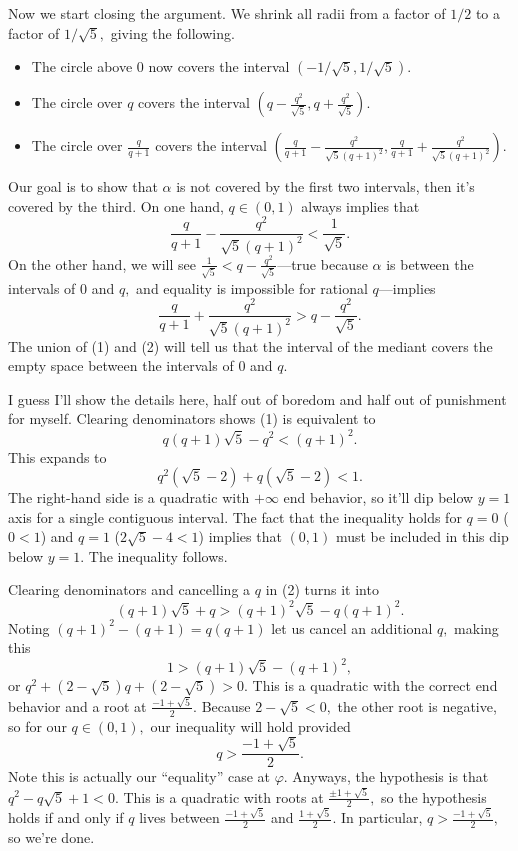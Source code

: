 Now we start closing the argument. We shrink all radii from a factor of $1/2$ to a factor of $1/\sqrt5,$ giving the following.
\begin{itemize}
    \item The circle above $0$ now covers the interval $(-1/\sqrt5,1/\sqrt5).$
    \item The circle over $q$ covers the interval $\left(q-\frac{q^2}{\sqrt5},q+\frac{q^2}{\sqrt5}\right).$
    \item The circle over $\frac q{q+1}$ covers the interval $\left(\frac q{q+1}-\frac{q^2}{\sqrt5(q+1)^2},\frac q{q+1}+\frac{q^2}{\sqrt5(q+1)^2}\right).$
\end{itemize}
Our goal is to show that $\alpha$ is not covered by the first two intervals, then it's covered by the third. On one hand, $q\in(0,1)$ always implies that
\[\frac q{q+1}-\frac{q^2}{\sqrt5(q+1)^2}<\frac1{\sqrt5}.\tag{1}\]
On the other hand, we will see $\frac1{\sqrt5}<q-\frac{q^{2}}{\sqrt{5}}$---true because $\alpha$ is between the intervals of $0$ and $q,$ and equality is impossible for rational $q$---implies
\[\frac q{q+1}+\frac{q^2}{\sqrt5(q+1)^2}>q-\frac{q^2}{\sqrt5}.\tag{2}\]
The union of (1) and (2) will tell us that the interval of the mediant covers the empty space between the intervals of $0$ and $q.$

I guess I'll show the details here, half out of boredom and half out of punishment for myself. Clearing denominators shows (1) is equivalent to
\[q(q+1)\sqrt5-q^2<(q+1)^2.\]
This expands to
\[q^{2}\left(\sqrt{5}-2\right)+q\left(\sqrt{5}-2\right)<1.\]
The right-hand side is a quadratic with $+\infty$ end behavior, so it'll dip below $y=1$ axis for a single contiguous interval. The fact that the inequality holds for $q=0$ ($0<1$) and $q=1$ ($2\sqrt5-4<1$) implies that $(0,1)$ must be included in this dip below $y=1.$ The inequality follows.

Clearing denominators and cancelling a $q$ in (2) turns it into
\[(q+1)\sqrt5+q>(q+1)^2\sqrt5-q(q+1)^2.\]
Noting $(q+1)^2-(q+1)=q(q+1)$ let us cancel an additional $q,$ making this
\[1>(q+1)\sqrt5-(q+1)^2,\]
or $q^2+(2-\sqrt5)q+(2-\sqrt5)>0.$ This is a quadratic with the correct end behavior and a root at $\frac{-1+\sqrt5}2.$ Because $2-\sqrt5<0,$ the other root is negative, so for our $q\in(0,1),$ our inequality will hold provided
\[q>\frac{-1+\sqrt5}2.\]
Note this is actually our ``equality'' case at $\varphi.$ Anyways, the hypothesis is that $q^2-q\sqrt5+1<0.$ This is a quadratic with roots at $\frac{\pm1+\sqrt5}2,$ so the hypothesis holds if and only if $q$ lives between $\frac{-1+\sqrt5}2$ and $\frac{1+\sqrt5}2.$ In particular, $q>\frac{-1+\sqrt5}2,$ so we're done.


